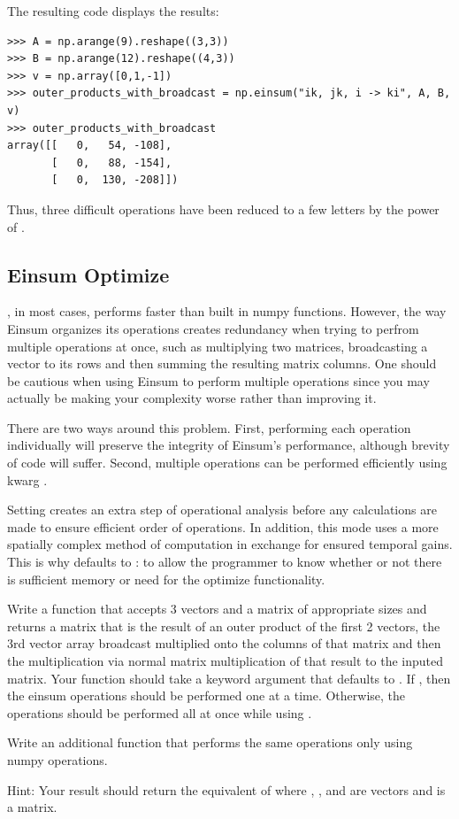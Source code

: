 The resulting code displays the results:
\begin{lstlisting}
>>> A = np.arange(9).reshape((3,3))
>>> B = np.arange(12).reshape((4,3))
>>> v = np.array([0,1,-1])
>>> outer_products_with_broadcast = np.einsum("ik, jk, i -> ki", A, B, v)
>>> outer_products_with_broadcast
array([[   0,   54, -108],
       [   0,   88, -154],
       [   0,  130, -208]])
\end{lstlisting}

\noindent Thus, three difficult operations have been reduced to a few letters by the power of .

\subsection*{Einsum Optimize}

, in most cases, performs faster than built in numpy functions. 
However, the way Einsum organizes its operations creates redundancy when trying to perfrom multiple operations at once, such as multiplying two matrices, broadcasting a vector to its rows and then summing the resulting matrix columns. 
One should be cautious when using Einsum to perform multiple operations since you may actually be making your complexity worse rather than improving it. 

There are two ways around this problem. 
First, performing each operation individually will preserve the integrity of Einsum's performance, although brevity of code will suffer. 
Second, multiple operations can be performed efficiently using kwarg .

Setting  creates an extra step of operational analysis before any calculations are made to ensure efficient order of operations. 
In addition, this mode uses a more spatially complex method of computation in exchange for ensured temporal gains. 
This is why  defaults to : to allow the programmer to know whether or not there is sufficient memory or need for the optimize functionality.

\begin{problem}
Write a function that accepts 3 vectors and a matrix of appropriate sizes and returns a matrix that is the result of an outer product of the first 2 vectors, the 3rd vector array broadcast multiplied onto the columns of that matrix and then the multiplication via normal matrix multiplication of that result to the inputed matrix. 
Your function should take a keyword argument  that defaults to . If , then the einsum operations should be performed one at a time. 
Otherwise, the operations should be performed all at once while using .

Write an additional function that performs the same operations only using numpy operations. 

Hint: Your result should return the equivalent of  where , , and  are vectors and  is a matrix.
\label{prob:outer product}
\end{problem}

